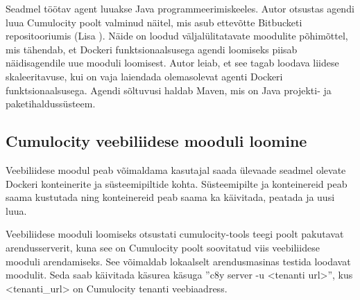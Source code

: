 \documentclass[12pt]{article}
\begin{document}
  Seadmel töötav agent luuakse Java programmeerimiskeeles. Autor otsustas agendi luua Cumulocity
  poolt valminud näitel, mis asub ettevõtte Bitbucketi repositooriumis (Lisa ).
  Näide on loodud
  väljalülitatavate moodulite põhimõttel, mis tähendab, et Dockeri funktsionaalsusega agendi
  loomiseks piisab näidisagendile uue mooduli loomisest. Autor leiab, et see tagab loodava liidese
  skaleeritavuse, kui on vaja laiendada olemasolevat agenti Dockeri funktsionaalsusega.
  Agendi
  sõltuvusi haldab Maven, mis on Java projekti- ja paketihaldussüsteem.
  
 
  
 
 
 
  \subsection{Cumulocity veebiliidese mooduli loomine}
 
  Veebiliidese moodul peab võimaldama kasutajal saada ülevaade seadmel olevate Dockeri
  konteinerite ja süsteemipiltide kohta. Süsteemipilte ja konteinereid peab saama kustutada
  ning konteinereid peab saama ka käivitada, peatada ja uusi luua.
 
  Veebiliidese mooduli loomiseks otsustati cumulocity-tools teegi poolt pakutavat arendusserverit,
  kuna see on Cumulocity poolt soovitatud viis veebiliidese mooduli arendamiseks.
  See võimaldab lokaalselt arendusmasinas testida loodavat moodulit. Seda saab käivitada
  käsurea käsuga ''c8y server -u <tenanti url>'', kus <tenanti\_url> on Cumulocity tenanti
  veebiaadress.
 
\end{document}
